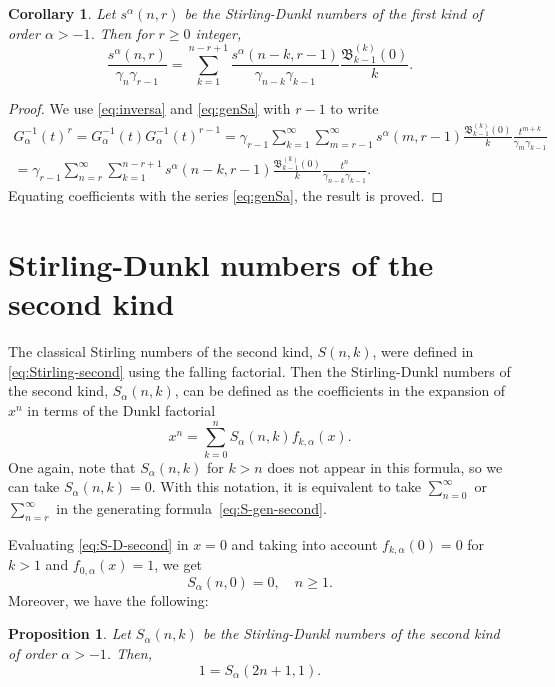 \documentclass[11pt,a4paper]{article}
\theoremstyle{plain}
\newtheorem{proposition}[theorem]{Proposition}
\newtheorem{corollary}[theorem]{Corollary}
\theoremstyle{remark}
\newcommand{\B}{\mathfrak{B}}
\begin{document}
\begin{corollary} 
Let $s^{\alpha}(n,r)$ be the Stirling-Dunkl numbers of the first kind of order $\alpha>-1$. Then for $r\ge 0$ integer,
\[
  \frac{s^{\alpha}(n,r)}{\gamma_n\gamma_{r-1}}
  = \sum_{k=1}^{n-r+1}\frac{s^{\alpha}(n-k,r-1)}{\gamma_{n-k}\gamma_{k-1}}
  \frac{\B_{k-1}^{(k)}(0)}{k}.
\]
\end{corollary}

\begin{proof}
We use \eqref{eq:inversa} and \eqref{eq:genSa} with $r-1$ to write
\begin{align*}
  G_{\alpha}^{-1}(t)^r = G_{\alpha}^{-1}(t)G_{\alpha}^{-1}(t)^{r-1}
  = \gamma_{r-1}\sum_{k=1}^{\infty} \sum_{m=r-1}^{\infty} s^{\alpha}(m,r-1)
  \frac{\B_{k-1}^{(k)}(0)}{k} \frac{t^{m+k}}{\gamma_m\gamma_{k-1}} \\
  = \gamma_{r-1}\sum_{n=r}^{\infty} \sum_{k=1}^{n-r+1} s^{\alpha}(n-k,r-1)
  \frac{\B_{k-1}^{(k)}(0)}{k} \frac{t^n}{\gamma_{n-k}\gamma_{k-1}}.
\end{align*}
Equating coefficients with the series \eqref{eq:genSa}, the result is proved.
\end{proof}

\section{Stirling-Dunkl numbers of the second kind}
\label{sec:S-D-second}

The classical Stirling numbers of the second kind, $S(n,k)$, were defined in \eqref{eq:Stirling-second} using the falling factorial. Then the Stirling-Dunkl numbers of the second kind, $S_{\alpha}(n,k)$, can be defined as the coefficients in the expansion of $x^n$ in terms of the Dunkl factorial 
\begin{equation}
\label{eq:S-D-second}
  x^n = \sum_{k=0}^n S_{\alpha}(n,k)f_{k,\alpha}(x).
\end{equation}
One again, note that $S_{\alpha}(n,k)$ for $k>n$ does not appear in this formula, so we can take $S_{\alpha}(n,k) = 0$. With this notation, it is equivalent to take $\sum_{n=0}^{\infty}$ or~$\sum_{n=r}^{\infty}$ in the generating formula~\eqref{eq:S-gen-second}.

Evaluating \eqref{eq:S-D-second} in $x=0$ and taking into account $f_{k,\alpha}(0)=0$ for $k>1$ and $f_{0,\alpha}(x)=1$, we get
\[
  S_{\alpha}(n,0)=0,\quad n\ge 1.
\]
Moreover, we have the following:

\begin{proposition}
\label{prop:S-D-2n+1} 
Let $S_{\alpha}(n,k)$ be the Stirling-Dunkl numbers of the second kind of order $\alpha>-1$. Then,
\[
  1 = S_{\alpha}(2n+1,1).
\]
\end{proposition}
\end{document}
